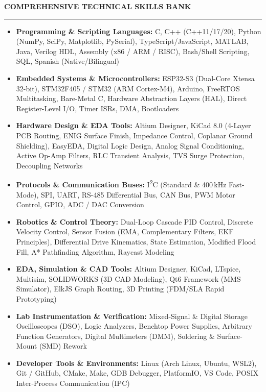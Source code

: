 \documentclass[10pt]{article}
\newcommand{\Section}[1]{%
  \vspace{4.5pt}%
  \textbf{\MakeUppercase{#1}}\par\vspace{-3.5pt}%
  \rule{\linewidth}{0.55pt}\par\vspace{2.5pt}%
}
\begin{document}
\Section{Comprehensive Technical Skills Bank}
\begin{itemize}[leftmargin=0.15in, label={}, itemsep=1.6pt, topsep=1.0pt]
  \item \textbf{Programming \& Scripting Languages:} C, C++ (C++11/17/20), Python (NumPy, SciPy, Matplotlib, PySerial), TypeScript/JavaScript, MATLAB, Java, Verilog HDL, Assembly (x86 / ARM / RISC), Bash/Shell Scripting, SQL, Spanish (Native/Bilingual)
  \item \textbf{Embedded Systems \& Microcontrollers:} ESP32-S3 (Dual-Core Xtensa 32-bit), STM32F405 / STM32 (ARM Cortex-M4), Arduino, FreeRTOS Multitasking, Bare-Metal C, Hardware Abstraction Layers (HAL), Direct Register-Level I/O, Timer ISRs, DMA, Bootloaders
  \item \textbf{Hardware Design \& EDA Tools:} Altium Designer, KiCad 8.0 (4-Layer PCB Routing, ENIG Surface Finish, Impedance Control, Coplanar Ground Shielding), EasyEDA, Digital Logic Design, Analog Signal Conditioning, Active Op-Amp Filters, RLC Transient Analysis, TVS Surge Protection, Decoupling Networks
  \item \textbf{Protocols \& Communication Buses:} I\textsuperscript{2}C (Standard \& 400\,kHz Fast-Mode), SPI, UART, RS-485 Differential Bus, CAN Bus, PWM Motor Control, GPIO, ADC / DAC Conversion
  \item \textbf{Robotics \& Control Theory:} Dual-Loop Cascade PID Control, Discrete Velocity Control, Sensor Fusion (EMA, Complementary Filters, EKF Principles), Differential Drive Kinematics, State Estimation, Modified Flood Fill, A* Pathfinding Algorithm, Raycast Modeling
  \item \textbf{EDA, Simulation \& CAD Tools:} Altium Designer, KiCad, LTspice, Multisim, SOLIDWORKS (3D CAD Modeling), Qt6 Framework (MMS Simulator), ElkJS Graph Routing, 3D Printing (FDM/SLA Rapid Prototyping)
  \item \textbf{Lab Instrumentation \& Verification:} Mixed-Signal \& Digital Storage Oscilloscopes (DSO), Logic Analyzers, Benchtop Power Supplies, Arbitrary Function Generators, Digital Multimeters (DMM), Soldering \& Surface-Mount (SMD) Rework
  \item \textbf{Developer Tools \& Environments:} Linux (Arch Linux, Ubuntu, WSL2), Git / GitHub, CMake, Make, GDB Debugger, PlatformIO, VS Code, POSIX Inter-Process Communication (IPC)
\end{itemize}
\end{document}
